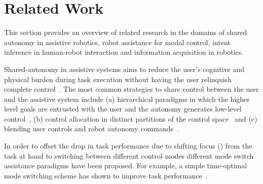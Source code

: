 \documentclass[natbib, twocolumn]{svjour3}          %
\begin{document}
%


\section{Related Work}\label{sec:related-work}
This section provides an overview of related research in the domains of shared autonomy in assistive robotics, robot assistance for modal control, intent inference in human-robot interaction and information acquisition in robotics. 

Shared-autonomy in assistive systems aims to reduce the user's cognitive and physical burden during task execution without having the user relinquish complete control~\citep{philips2007adaptive, demeester2008user, gopinath2017human, muelling2017autonomy}. The most common strategies to share control between the user and the assistive system include (a) hierarchical paradigms in which the higher level goals are entrusted with the user and the autonomy generates low-level control~\citep{tsui2011want, kim2010relationship, kim2012autonomy}, (b) control allocation in distinct partitions of the control space~\citep{driessen2005collaborative} and (c) blending user controls and robot autonomy commands~\citep{downey2016blending, storms2014blending, muelling2017autonomy}. 

In order to offset the drop in task performance due to shifting focus () from the task at hand to switching between different control modes different mode switch assistance paradigms have been proposed. For example, a simple time-optimal mode switching scheme has shown to improve task performance~\citep{herlant2016assistive, pilarski2012dynamic}. 
\end{document}
